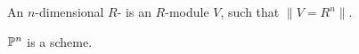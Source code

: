 
\begin{definition}
  An $n$-dimensional $R$- is an $R$-module $V$,
  such that $\| V = R^n \|$.
\end{definition}


\begin{theorem}
  $\mathbb{P}^n$ is a scheme.
\end{theorem}
